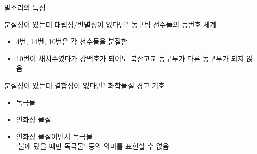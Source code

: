 \documentclass[11pt, aspectratio=169]{beamer}
\begin{document}
\begin{frame}[t]{말소리의 특징}
    \begin{block}{분절성이 있는데 대립성/변별성이 없다면?}
        농구팀 선수들의 등번호 체계
        \begin{itemize}
            \item 4번, 14번, 10번은 각 선수들을 분절함
            \item 10번이 채치수였다가 강백호가 되어도 북산고교 농구부가 다른 농구부가 되지 않음
        \end{itemize}
    \end{block}
    \begin{block}{분절성이 있는데 결합성이 없다면?}
        화학물질 경고 기호
        \begin{itemize}
            \item {} 독극물
            \item {} 인화성 물질
            \item {}  인화성 물질이면서 독극물 \\ ‘불에 탔을 때만 독극물’ 등의 의미를 표현할 수 없음
        \end{itemize}
    \end{block}
\end{frame}
\end{document}
